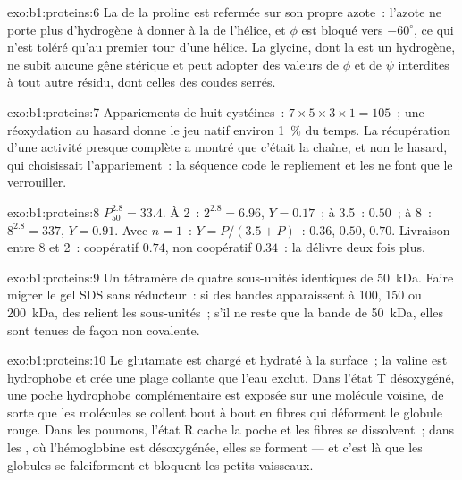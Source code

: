 \begin{solution}{exo:b1:proteins:6}
La  de la proline est refermée sur son propre azote~:
l'azote ne porte plus d'hydrogène à donner à la  de
l'hélice, et $\phi$ est bloqué vers $-60^\circ$, ce qui n'est toléré
qu'au premier tour d'une hélice. La glycine, dont la  est
un hydrogène, ne subit aucune gêne stérique et peut adopter des valeurs
de $\phi$ et de $\psi$ interdites à tout autre résidu, dont celles des
coudes serrés.
\end{solution}

\begin{solution}{exo:b1:proteins:7}
Appariements de huit cystéines~: $7\times 5\times 3\times 1 = 105$~; une
réoxydation au hasard donne le jeu natif environ \qty{1}{\%} du temps.
La récupération d'une activité presque complète a montré que c'était la
chaîne, et non le hasard, qui choisissait l'appariement~: la séquence
code le repliement et les  ne font que le verrouiller.
\end{solution}

\begin{solution}{exo:b1:proteins:8}
$P_{50}^{2.8} = 33.4$. À 2~: $2^{2.8} = 6.96$, $Y = 0.17$~; à 3.5~:
$0.50$~; à 8~: $8^{2.8} = 337$, $Y = 0.91$. Avec $n = 1$~: $Y =
P/(3.5 + P)$~: $0.36$, $0.50$, $0.70$. Livraison entre 8 et 2~:
coopératif $0.74$, non coopératif $0.34$~: la  
délivre deux fois plus.
\end{solution}

\begin{solution}{exo:b1:proteins:9}
Un tétramère de quatre sous-unités identiques de \qty{50}{kDa}. Faire
migrer le gel SDS sans réducteur~: si des bandes apparaissent à 100, 150
ou \qty{200}{kDa}, des  relient les sous-unités~; s'il ne
reste que la bande de \qty{50}{kDa}, elles sont tenues de façon non
covalente.
\end{solution}

\begin{solution}{exo:b1:proteins:10}
Le glutamate est chargé et hydraté à la surface~; la valine est
hydrophobe et crée une plage collante que l'eau exclut. Dans l'état T
désoxygéné, une poche hydrophobe complémentaire est exposée sur une
molécule voisine, de sorte que les molécules se collent bout à bout en
fibres qui déforment le globule rouge. Dans les poumons, l'état R cache
la poche et les fibres se dissolvent~; dans les , où l'hémoglobine
est désoxygénée, elles se forment --- et c'est là que les globules se
falciforment et bloquent les petits vaisseaux.
\end{solution}

